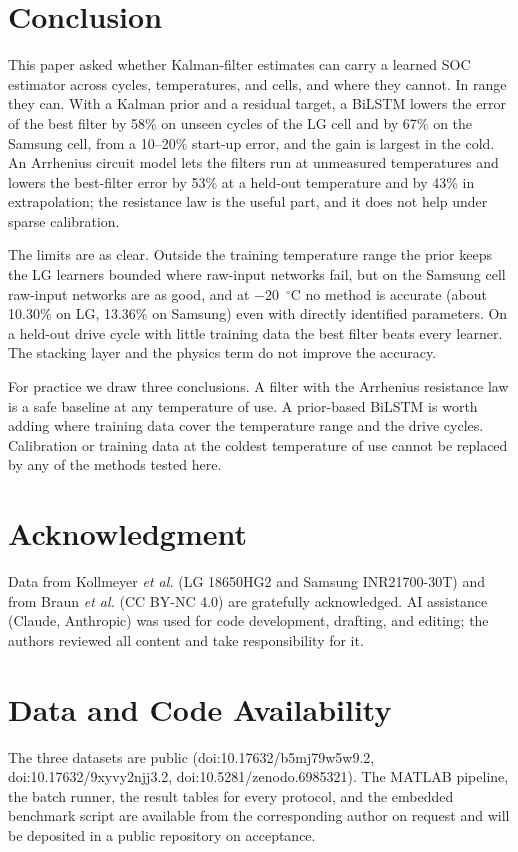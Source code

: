 \documentclass[journal]{IEEEtran}
\begin{document}
\section{Conclusion}
This paper asked whether Kalman-filter estimates can carry a learned SOC estimator across cycles, temperatures, and cells, and where they cannot. In range they can. With a Kalman prior and a residual target, a BiLSTM lowers the error of the best filter by 58\% on unseen cycles of the LG cell and by 67\% on the Samsung cell, from a 10--20\% start-up error, and the gain is largest in the cold. An Arrhenius circuit model lets the filters run at unmeasured temperatures and lowers the best-filter error by 53\% at a held-out temperature and by 43\% in extrapolation; the resistance law is the useful part, and it does not help under sparse calibration.

The limits are as clear. Outside the training temperature range the prior keeps the LG learners bounded where raw-input networks fail, but on the Samsung cell raw-input networks are as good, and at $-20$~$^\circ$C no method is accurate (about 10.30\% on LG, 13.36\% on Samsung) even with directly identified parameters. On a held-out drive cycle with little training data the best filter beats every learner. The stacking layer and the physics term do not improve the accuracy.

For practice we draw three conclusions. A filter with the Arrhenius resistance law is a safe baseline at any temperature of use. A prior-based BiLSTM is worth adding where training data cover the temperature range and the drive cycles. Calibration or training data at the coldest temperature of use cannot be replaced by any of the methods tested here.

\section*{Acknowledgment}
Data from Kollmeyer \emph{et al.} (LG 18650HG2 and Samsung INR21700-30T) and from Braun \emph{et al.} (CC BY-NC 4.0) are gratefully acknowledged. AI assistance (Claude, Anthropic) was used for code development, drafting, and editing; the authors reviewed all content and take responsibility for it.

\section*{Data and Code Availability}
The three datasets are public (doi:10.17632/b5mj79w5w9.2, doi:10.17632/9xyvy2njj3.2, doi:10.5281/zenodo.6985321). The MATLAB pipeline, the batch runner, the result tables for every protocol, and the embedded benchmark script are available from the corresponding author on request and will be deposited in a public repository on acceptance.
\end{document}
